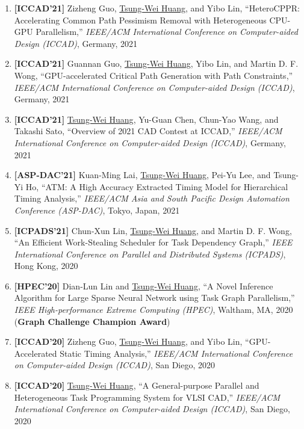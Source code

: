 \documentclass[A4,11pt]{article}
\begin{document}
\begin{enumerate}
    \item \textbf{[ICCAD'21]} Zizheng Guo, \underline{Tsung-Wei Huang}, and Yibo Lin, ``HeteroCPPR: Accelerating Common Path Pessimism Removal with Heterogeneous CPU-GPU Parallelism,'' \textit{IEEE/ACM International Conference on Computer-aided Design (ICCAD)}, Germany, 2021

    \item \textbf{[ICCAD'21]} Guannan Guo, \underline{Tsung-Wei Huang}, Yibo Lin, and Martin D. F. Wong, ``GPU-accelerated Critical Path Generation with Path Constraints,'' \textit{IEEE/ACM International Conference on Computer-aided Design (ICCAD)}, Germany, 2021

    \item \textbf{[ICCAD'21]} \underline{Tsung-Wei Huang}, Yu-Guan Chen, Chun-Yao Wang, and Takashi Sato, ``Overview of 2021 CAD Contest at ICCAD,'' \textit{IEEE/ACM International Conference on Computer-aided Design (ICCAD)}, Germany, 2021

    \item \textbf{[ASP-DAC'21]} Kuan-Ming Lai, \underline{Tsung-Wei Huang}, Pei-Yu Lee, and Tsung-Yi Ho, ``ATM: A High Accuracy Extracted Timing Model for Hierarchical Timing Analysis,'' \textit{IEEE/ACM Asia and South Pacific Design Automation Conference (ASP-DAC)}, Tokyo, Japan, 2021

    \item \textbf{[ICPADS'21]} Chun-Xun Lin, \underline{Tsung-Wei Huang}, and Martin D. F. Wong, ``An Efficient Work-Stealing Scheduler for Task Dependency Graph,'' \textit{IEEE International Conference on Parallel and Distributed Systems (ICPADS)}, Hong Kong, 2020

    \item \textbf{[HPEC'20]} Dian-Lun Lin and \underline{Tsung-Wei Huang}, ``A Novel Inference Algorithm for Large Sparse Neural Network using Task Graph Parallelism,'' \textit{IEEE High-performance Extreme Computing (HPEC)}, Waltham, MA, 2020 (\textbf{Graph Challenge Champion Award})

    \item \textbf{[ICCAD'20]} Zizheng Guo, \underline{Tsung-Wei Huang}, and Yibo Lin, ``GPU-Accelerated Static Timing Analysis,'' \textit{IEEE/ACM International Conference on Computer-aided Design (ICCAD)}, San Diego, 2020 

    \item \textbf{[ICCAD'20]} \underline{Tsung-Wei Huang}, ``A General-purpose Parallel and Heterogeneous Task Programming System for VLSI CAD,'' \textit{IEEE/ACM International Conference on Computer-aided Design (ICCAD)}, San Diego, 2020


\end{enumerate}
\end{document}
